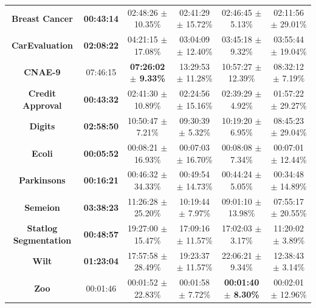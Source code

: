 \documentclass[iicol]{sn-jnl}
\theoremstyle{thmstyleone}%
\theoremstyle{thmstyletwo}%
\theoremstyle{thmstylethree}%
\begin{document}
\begin{table}
{\begin{tabular}{cccccc}
\textbf{Breast Cancer}          & \textbf{00:43:14} & 02:48:26 $\pm$ 10.35\%          & 02:41:29 $\pm$ 15.72\%     & 02:46:45 $\pm$ 5.13\%          & 02:11:56 $\pm$ 29.01\%          \\
\textbf{CarEvaluation}          & \textbf{02:08:22} & 04:21:15 $\pm$ 17.08\%          & 03:04:09 $\pm$ 12.40\%     & 03:45:18 $\pm$ 9.32\%          & 03:55:44 $\pm$ 19.04\%          \\
\textbf{CNAE-9}                 & 07:46:15          & \textbf{07:26:02 $\pm$ 9.33\%}  & 13:29:53 $\pm$ 11.28\%     & 10:57:27 $\pm$ 12.39\%         & 08:32:12 $\pm$ 7.19\%           \\
\textbf{Credit   Approval}      & \textbf{00:43:32} & 02:41:30 $\pm$ 10.89\%          & 02:24:56 $\pm$ 15.16\%     & 02:39:29 $\pm$ 4.92\%          & 01:57:22 $\pm$ 29.27\%          \\
\textbf{Digits}                 & \textbf{02:58:50} & 10:50:47 $\pm$ 7.21\%           & 09:30:39 $\pm$ 5.32\%      & 10:19:20 $\pm$ 6.95\%          & 08:45:23 $\pm$ 29.04\%          \\
\textbf{Ecoli}                  & \textbf{00:05:52} & 00:08:21 $\pm$ 16.93\%          & 00:07:03 $\pm$ 16.70\%     & 00:08:08 $\pm$ 7.34\%          & 00:07:01 $\pm$ 12.44\%          \\
\textbf{Parkinsons}             & \textbf{00:16:21} & 00:46:32 $\pm$ 34.33\%          & 00:49:54 $\pm$ 14.73\%     & 00:44:24 $\pm$ 5.05\%          & 00:34:48 $\pm$ 14.89\%          \\
\textbf{Semeion}                & \textbf{03:38:23} & 11:26:28 $\pm$ 25.20\%          & 10:19:44 $\pm$ 7.97\%      & 09:01:10 $\pm$ 13.98\%         & 07:55:17 $\pm$ 20.55\%          \\
\textbf{Statlog   Segmentation} & \textbf{00:48:57} & 19:27:00 $\pm$ 15.47\%          & 17:09:16 $\pm$ 11.57\%     & 17:02:03 $\pm$ 3.17\%          & 11:20:02 $\pm$ 3.89\%           \\
\textbf{Wilt}                   & \textbf{01:23:04} & 17:57:58 $\pm$ 28.49\%          & 19:23:37 $\pm$ 11.57\%     & 22:06:21 $\pm$ 9.34\%          & 12:38:43 $\pm$ 3.14\%           \\
\textbf{Zoo}                    & 00:01:46          & 00:01:52 $\pm$ 22.83\%          & 00:01:58 $\pm$ 7.72\%      & \textbf{00:01:40 $\pm$ 8.30\%} & 00:02:01 $\pm$ 12.96\%          \\ \hline
\end{tabular}%
}
\end{table}
\end{document}
